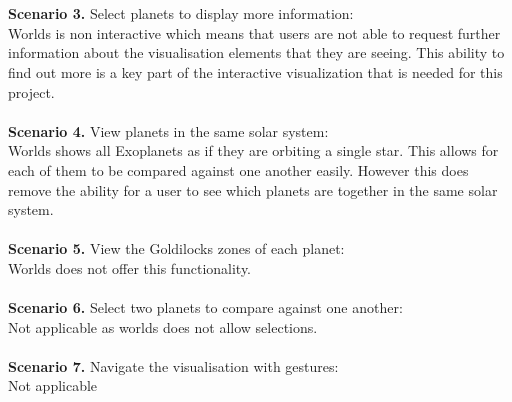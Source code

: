 \\\\
{\bf Scenario 3.} Select planets to display more information:\\
Worlds is non interactive which means that users are not able to request further information about the visualisation elements that they are seeing. This ability to find out more is a key part of the interactive visualization that is needed for this project.
\\\\
{\bf Scenario 4.} View planets in the same solar system:\\
Worlds shows all Exoplanets as if they are orbiting a single star. This allows for each of them to be compared against one another easily. However this does remove the ability for a user to see which planets are together in the same solar system.
\\\\
{\bf Scenario 5.} View the Goldilocks zones of each planet:\\
Worlds does not offer this functionality.
\\\\
{\bf Scenario 6.} Select two planets to compare against one another:\\
Not applicable as worlds does not allow selections.
\\\\
{\bf Scenario 7.} Navigate the visualisation with gestures:\\
Not applicable


